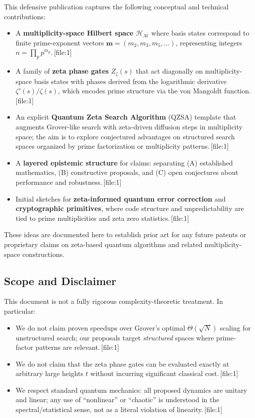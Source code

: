 \documentclass[11pt]{article}
\begin{document}
This defensive publication captures the following conceptual and technical contributions:

\begin{itemize}[leftmargin=*]
    \item A \textbf{multiplicity-space Hilbert space} \(\mathcal{H}_{\mathcal{M}}\) where basis states correspond to finite prime-exponent vectors \(\mathbf{m} = (m_2, m_3, m_5, \dots)\), representing integers \(n = \prod_p p^{m_p}\).\,[file:1]
    \item A family of \textbf{zeta phase gates} \(Z_\zeta(s)\) that act diagonally on multiplicity-space basis states with phases derived from the logarithmic derivative \(\zeta'(s)/\zeta(s)\), which encodes prime structure via the von Mangoldt function.\,[file:1]
    \item An explicit \textbf{Quantum Zeta Search Algorithm} (QZSA) template that augments Grover-like search with zeta-driven diffusion steps in multiplicity space; the aim is to explore conjectured advantages on structured search spaces organized by prime factorization or multiplicity patterns.\,[file:1]
    \item A \textbf{layered epistemic structure} for claims: separating (A) established mathematics, (B) constructive proposals, and (C) open conjectures about performance and robustness.\,[file:1]
    \item Initial sketches for \textbf{zeta-informed quantum error correction} and \textbf{cryptographic primitives}, where code structure and unpredictability are tied to prime multiplicities and zeta zero statistics.\,[file:1]
\end{itemize}

These ideas are documented here to establish prior art for any future patents or proprietary claims on zeta-based quantum algorithms and related multiplicity-space constructions.

\subsection{Scope and Disclaimer}

This document is not a fully rigorous complexity-theoretic treatment. In particular:

\begin{itemize}[leftmargin=*]
    \item We do not claim proven speedups over Grover's optimal \(\Theta(\sqrt{N})\) scaling for unstructured search; our proposals target \emph{structured} spaces where prime-factor patterns are relevant.\,[file:1]
    \item We do not claim that the zeta phase gates can be evaluated exactly at arbitrary large heights \(t\) without incurring significant classical cost.\,[file:1]
    \item We respect standard quantum mechanics: all proposed dynamics are unitary and linear; any use of ``nonlinear'' or ``chaotic'' is understood in the spectral/statistical sense, not as a literal violation of linearity.\,[file:1]
\end{itemize}
\end{document}
